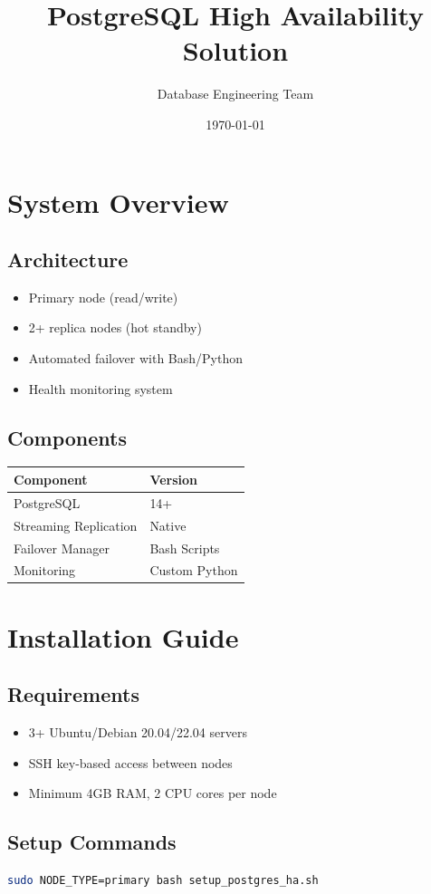 \documentclass{article}
\title{PostgreSQL High Availability Solution}
\author{Database Engineering Team}
\date{\today}
\begin{document}
\maketitle

\tableofcontents

\section{System Overview}
\subsection{Architecture}
\begin{itemize}
\item Primary node (read/write)
\item 2+ replica nodes (hot standby)
\item Automated failover with Bash/Python
\item Health monitoring system
\end{itemize}

\subsection{Components}
\begin{tabular}{|l|l|}
\hline
\textbf{Component} & \textbf{Version} \\
\hline
PostgreSQL & 14+ \\
Streaming Replication & Native \\
Failover Manager & Bash Scripts \\
Monitoring & Custom Python \\
\hline
\end{tabular}

\section{Installation Guide}
\subsection{Requirements}
\begin{itemize}
\item 3+ Ubuntu/Debian 20.04/22.04 servers
\item SSH key-based access between nodes
\item Minimum 4GB RAM, 2 CPU cores per node
\end{itemize}

\subsection{Setup Commands}
\begin{lstlisting}[language=bash,caption={Primary Node Setup}]
sudo NODE_TYPE=primary bash setup_postgres_ha.sh
\end{lstlisting}
\end{document}
